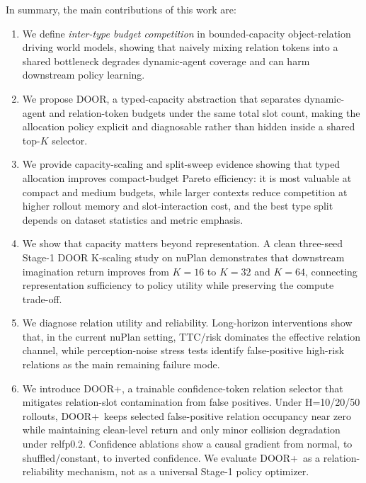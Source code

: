 \documentclass[10pt,journal,compsoc]{IEEEtran}
\newcommand{\method}{\textsc{DOOR}}
\newcommand{\doorplus}{\textsc{DOOR+}}
\begin{document}
In summary, the main contributions of this work are:
\begin{enumerate}
\item We define \emph{inter-type budget competition} in bounded-capacity object-relation driving world models, showing that naively mixing relation tokens into a shared bottleneck degrades dynamic-agent coverage and can harm downstream policy learning.
\item We propose \method, a typed-capacity abstraction that separates dynamic-agent and relation-token budgets under the same total slot count, making the allocation policy explicit and diagnosable rather than hidden inside a shared top-$K$ selector.
\item We provide capacity-scaling and split-sweep evidence showing that typed allocation improves compact-budget Pareto efficiency: it is most valuable at compact and medium budgets, while larger contexts reduce competition at higher rollout memory and slot-interaction cost, and the best type split depends on dataset statistics and metric emphasis.
\item We show that capacity matters beyond representation. A clean three-seed Stage-1 DOOR K-scaling study on nuPlan demonstrates that downstream imagination return improves from $K=16$ to $K=32$ and $K=64$, connecting representation sufficiency to policy utility while preserving the compute trade-off.
\item We diagnose relation utility and reliability. Long-horizon interventions show that, in the current nuPlan setting, TTC/risk dominates the effective relation channel, while perception-noise stress tests identify false-positive high-risk relations as the main remaining failure mode.
\item We introduce \doorplus, a trainable confidence-token relation selector that mitigates relation-slot contamination from false positives. Under H=10/20/50 rollouts, \doorplus\ keeps selected false-positive relation occupancy near zero while maintaining clean-level return and only minor collision degradation under relfp0.2. Confidence ablations show a causal gradient from normal, to shuffled/constant, to inverted confidence. We evaluate \doorplus\ as a relation-reliability mechanism, not as a universal Stage-1 policy optimizer.
\end{enumerate}



\end{document}
